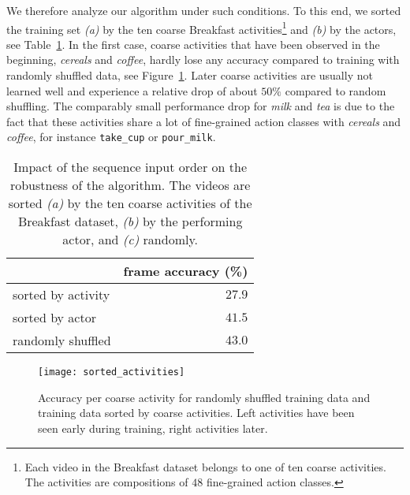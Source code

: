 \documentclass[10pt,twocolumn,letterpaper]{article}
\begin{document}
We therefore analyze our algorithm under such conditions. To this end, we sorted the training set \textit{(a)} by the ten coarse Breakfast activities\footnote{Each video in the Breakfast dataset belongs to one of ten coarse activities. The activities are compositions of $ 48 $ fine-grained action classes.}
and \textit{(b)} by the actors, see Table~\ref{tab:inputOrder}.
In the first case, coarse activities that have been observed in the beginning, \eg \textit{cereals} and \textit{coffee},
hardly lose any accuracy compared to training with randomly shuffled data, see Figure~\ref{fig:sortedActivities}.
Later coarse activities are usually not learned well and experience a relative drop of about $ 50\% $ compared to random shuffling.
The comparably small performance drop for \textit{milk} and \textit{tea} is due to the fact that
these activities share a lot of fine-grained action classes with \textit{cereals} and \textit{coffee},
for instance \texttt{take\_cup} or \texttt{pour\_milk}.

\begin{table}
    \footnotesize
    \begin{tabularx}{0.48\textwidth}{Xr}
        \toprule
                                & frame accuracy (\%) \\
        \midrule
            sorted by activity      & $ 27.9 $ \\
            sorted by actor         & $ 41.5 $ \\
            randomly shuffled       & $ 43.0 $ \\
        \bottomrule
    \end{tabularx}
    \caption{Impact of the sequence input order on the robustness of the algorithm.
             The videos are sorted \textit{(a)} by the ten coarse activities of the
             Breakfast dataset, \textit{(b)} by the performing actor, and \textit{(c)}
             randomly.}
    \label{tab:inputOrder}
\end{table}

\begin{figure}
    \centering
    \texttt{[image: sorted\_activities]}
    \caption{Accuracy per coarse activity for randomly shuffled training data and training data sorted
             by coarse activities. Left activities have been seen early during training, right activities later.}
    \label{fig:sortedActivities}
    \vspace{-0.3cm}
\end{figure}
\end{document}
